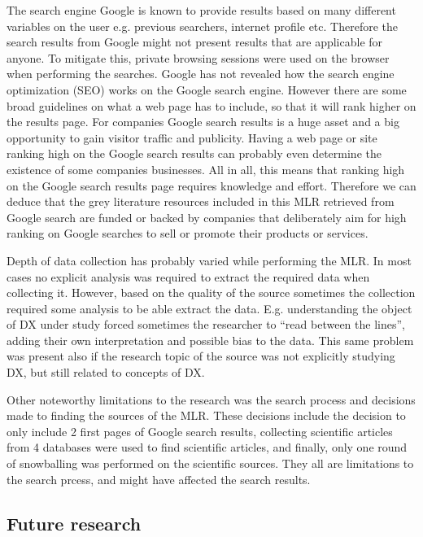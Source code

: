 \documentclass[english, 12pt, a4paper, sci, utf8, a-1b, online]{aaltothesis}
\begin{document}
The search engine Google is known to provide results based on many different variables on the user e.g. previous searchers, internet profile etc. Therefore the search results from Google might not present results that are applicable for anyone. To mitigate this, private browsing sessions were used on the browser when performing the searches. Google has not revealed how the search engine optimization (SEO) works on the Google search engine. However there are some broad guidelines on what a web page has to include, so that it will rank higher on the results page. For companies Google search results is a huge asset and a big opportunity to gain visitor traffic and publicity. Having a web page or site ranking high on the Google search results can probably even determine the existence of some companies businesses. All in all, this means that ranking high on the Google search results page requires knowledge and effort. Therefore we can deduce that the grey literature resources included in this MLR retrieved from Google search are funded or backed by companies that deliberately aim for high ranking on Google searches to sell or promote their products or services.

Depth of data collection has probably varied while performing the MLR. In most cases no explicit analysis was required to extract the required data when collecting it. However, based on the quality of the source sometimes the collection required some analysis to be able extract the data. E.g. understanding the object of DX under study forced sometimes the researcher to ``read between the lines'', adding their own interpretation and possible bias to the data. This same problem was present also if the research topic of the source was not explicitly  studying DX, but still related to concepts of DX.

Other noteworthy limitations to the research was the search process and decisions made to finding the sources of the MLR. These decisions include the decision to only include 2 first pages of Google search results, collecting scientific articles from 4 databases were used to find scientific articles, and finally, only one round of snowballing was performed on the scientific sources. They all are limitations to the search prcess, and might have affected the search results.

\subsection{Future research}
\end{document}
